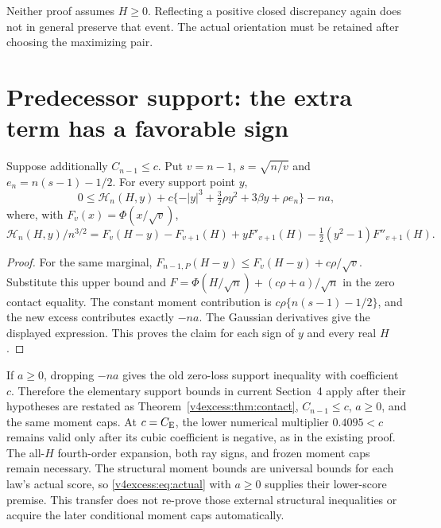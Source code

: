 Neither proof assumes $H\ge0$. Reflecting a positive closed discrepancy
again does not in general preserve that event. The actual orientation
must be retained after choosing the maximizing pair.

\section{Predecessor support: the extra term has a favorable sign}
\begin{theorem}\label{v4excess:thm:support}
Suppose additionally $C_{n-1}\le c$. Put $v=n-1$,
$s=\sqrt{n/v}$ and $e_n=n(s-1)-1/2$. For every support point $y$,
\begin{equation}\label{v4excess:eq:support}
 0\le\mathcal H_n(H,y)
       +c\{-|y|^3+\tfrac32\rho y^2+3\beta y+\rho e_n\}-na,
\end{equation}
where, with $F_v(x)=\Phi(x/\sqrt v)$,
\[
 \mathcal H_n(H,y)/n^{3/2}
 =F_v(H-y)-F_{v+1}(H)+yF'_{v+1}(H)
                    -\tfrac12(y^2-1)F''_{v+1}(H).
\]
\end{theorem}
\begin{proof}
For the same marginal,
$F_{n-1,P}(H-y)\le F_v(H-y)+c\rho/\sqrt v$.
Substitute this upper bound and
$F=\Phi(H/\sqrt n)+(c\rho+a)/\sqrt n$ in the zero contact equality.
The constant moment contribution is
$c\rho\{n(s-1)-1/2\}$, and the new excess contributes exactly $-na$.
The Gaussian derivatives give the displayed expression. This proves the
claim for each sign of $y$ and every real $H$.
\end{proof}

If $a\ge0$, dropping $-na$ gives the old zero-loss support inequality
with coefficient $c$. Therefore the elementary support bounds in current
Section~4 apply after their hypotheses are restated as
Theorem~\ref{v4excess:thm:contact}, $C_{n-1}\le c$, $a\ge0$, and the same moment
caps. At $c=C_{\mathrm E}$, the lower numerical multiplier $0.4095<c$ remains
valid only after its cubic coefficient is negative, as in the existing
proof. The all-$H$ fourth-order expansion, both ray signs, and frozen
moment caps remain necessary. The structural moment bounds are universal
bounds for each law's actual score, so \eqref{v4excess:eq:actual} with $a\ge0$
supplies their lower-score premise. This transfer does not re-prove those
external structural inequalities or acquire the later conditional moment
caps automatically.

